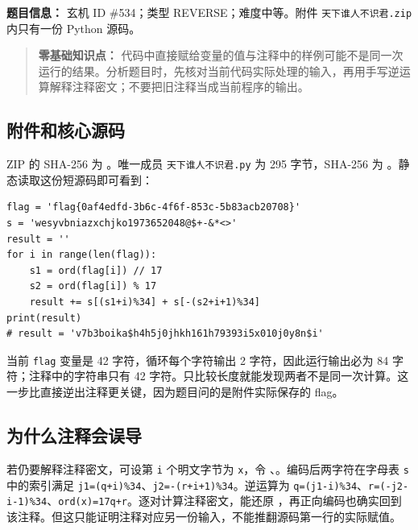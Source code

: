 \textbf{题目信息：} 玄机 ID \#534；类型 REVERSE；难度中等。附件 \texttt{天下谁人不识君.zip} 内只有一份 Python 源码。

\begin{quote}
\textbf{零基础知识点：} 代码中直接赋给变量的值与注释中的样例可能不是同一次运行的结果。分析题目时，先核对当前代码实际处理的输入，再用手写逆运算解释注释密文；不要把旧注释当成当前程序的输出。
\end{quote}

\subsection{附件和核心源码}\label{ux9644ux4ef6ux548cux6838ux5fc3ux6e90ux7801}

ZIP 的 SHA-256 为 \texttt{}。唯一成员 \texttt{天下谁人不识君.py} 为 295 字节，SHA-256 为 \texttt{}。静态读取这份短源码即可看到：

\begin{verbatim}
flag = 'flag{0af4edfd-3b6c-4f6f-853c-5b83acb20708}'
s = 'wesyvbniazxchjko1973652048@$+-&*<>'
result = ''
for i in range(len(flag)):
    s1 = ord(flag[i]) // 17
    s2 = ord(flag[i]) % 17
    result += s[(s1+i)%34] + s[-(s2+i+1)%34]
print(result)
# result = 'v7b3boika$h4h5j0jhkh161h79393i5x010j0y8n$i'
\end{verbatim}

当前 \texttt{flag} 变量是 42 字符，循环每个字符输出 2 字符，因此运行输出必为 84 字符；注释中的字符串只有 42 字符。只比较长度就能发现两者不是同一次计算。这一步比直接逆出注释更关键，因为题目问的是附件实际保存的 flag。

\subsection{为什么注释会误导}\label{ux4e3aux4ec0ux4e48ux6ce8ux91caux4f1aux8befux5bfc}

若仍要解释注释密文，可设第 \texttt{i} 个明文字节为 \texttt{x}，令 \texttt{}、\texttt{}。编码后两字符在字母表 \texttt{s} 中的索引满足 \texttt{j1=(q+i)\%34}、\texttt{j2=-(r+i+1)\%34}。逆运算为 \texttt{q=(j1-i)\%34}、\texttt{r=(-j2-i-1)\%34}、\texttt{ord(x)=17q+r}。逐对计算注释密文，能还原 \texttt{}，再正向编码也确实回到该注释。但这只能证明注释对应另一份输入，不能推翻源码第一行的实际赋值。


